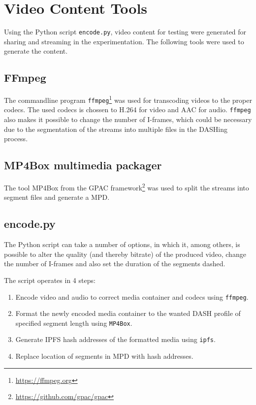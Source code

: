 \section{Video Content Tools}
\label{sec:impl-video}
Using the Python script \texttt{encode.py}, video content for testing were generated for sharing and streaming in the experimentation. The following tools were used to generate the content.

\subsection{FFmpeg}
The commandline program \texttt{ffmpeg}\footnote{\url{https://ffmpeg.org}} was used for transcoding videos to the proper codecs. The used codecs is chossen to H.264 for video and AAC for audio. 
\texttt{ffmpeg} also makes it possible to change the number of I-frames, which could be necessary due to the segmentation of the streams into multiple files in the DASHing process.

\subsection{MP4Box multimedia packager}
The tool MP4Box from the GPAC framework\footnote{\url{https://github.com/gpac/gpac}} was used to split the streams into segment files and generate a \ac{MPD}.

\subsection{encode.py}
The Python script can take a number of options, in which it, among others, is possible to alter the quality (and thereby bitrate) of the produced video, change the number of \acp{I-frame} and also set the duration of the segments dashed.

The script operates in 4 steps:
\begin{enumerate}
    \item Encode video and audio to correct media container and codecs using \texttt{ffmpeg}.
    \item Format the newly encoded media container to the wanted DASH profile of specified segment length using \texttt{MP4Box}.
    \item Generate \ac{IPFS} hash addresses of the formatted media using \texttt{ipfs}.
    \item Replace location of segments in \ac{MPD} with hash addresses.
\end{enumerate}

